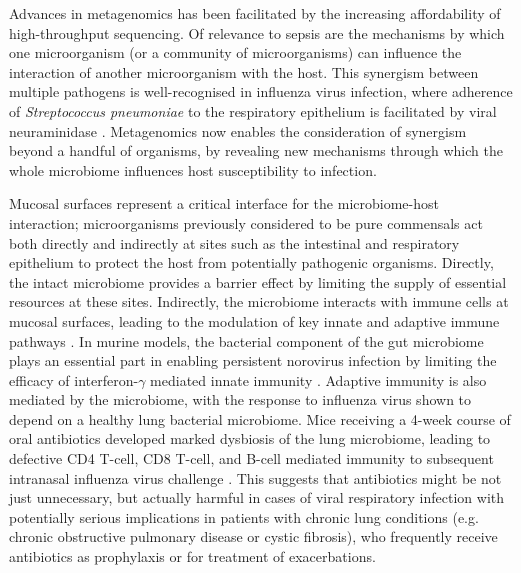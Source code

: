 Advances in metagenomics has been facilitated by the increasing affordability of high-throughput sequencing. Of relevance to sepsis are the mechanisms by which one microorganism (or a community of microorganisms) can influence the interaction of another microorganism with the host. This synergism between multiple pathogens is well-recognised in influenza virus infection, where adherence of \textit{Streptococcus pneumoniae} to the respiratory epithelium is facilitated by viral neuraminidase \parencite{Peltola2005}. Metagenomics now enables the consideration of synergism beyond a handful of organisms, by revealing new mechanisms through which the whole microbiome influences host susceptibility to infection.

Mucosal surfaces represent a critical interface for the microbiome-host interaction; microorganisms previously considered to be pure commensals act both directly and indirectly at sites such as the intestinal and respiratory epithelium to protect the host from potentially pathogenic organisms. Directly, the intact microbiome provides a barrier effect by limiting the supply of essential resources at these sites. Indirectly, the microbiome interacts with immune cells at mucosal surfaces, leading to the modulation of key innate and adaptive immune pathways \parencite{Thaiss2016}. In murine models, the bacterial component of the gut microbiome plays an essential part in enabling persistent norovirus infection by limiting the efficacy of interferon-$\gamma$ mediated innate immunity \parencite{Baldridge2015}. Adaptive immunity is also mediated by the microbiome, with the response to influenza virus shown to depend on a healthy lung bacterial microbiome. Mice receiving a 4-week course of oral antibiotics developed marked dysbiosis of the lung microbiome, leading to defective CD4 T-cell, CD8 T-cell, and B-cell mediated immunity to subsequent intranasal influenza virus challenge \parencite{Ichinohe2011}. This suggests that antibiotics might be not just unnecessary, but actually harmful in cases of viral respiratory infection with potentially serious implications in patients with chronic lung conditions (e.g. chronic obstructive pulmonary disease or cystic fibrosis), who frequently receive antibiotics as prophylaxis or for treatment of exacerbations. 

